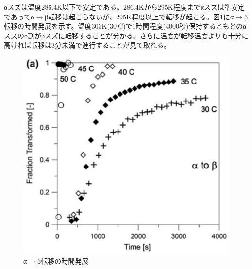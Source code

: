 αスズは温度286.4K以下で安定である。286.4Kから295K程度までαスズは準安定であってα$\to$β転移は起こらないが、295K程度以上で転移が起こる。図\ref{fig:alpha-to-beta}にα$\to$β転移の時間発展を示す\cite{Nogita}。温度303K(30℃)で1時間程度(4000秒)保持するともとのαスズの8割がβスズに転移することが分かる。さらに温度が転移温度よりも十分に高ければ転移は3分未満で進行することが見て取れる。
\begin{figure}[!h]
  \begin{center}
   \includegraphics[width=0.5\hsize]{Introduction/alpha-to-beta.eps}
  \end{center}
  \caption{α$\to$β転移の時間発展}
  \label{fig:alpha-to-beta}
  \end{figure}

